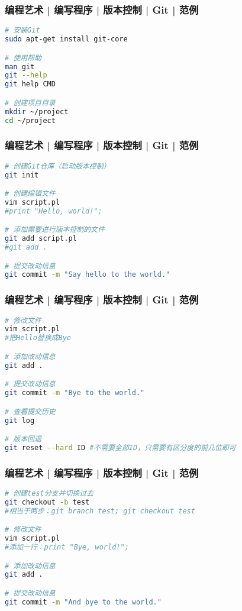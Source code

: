 \begin{frame}[fragile]
  \frametitle{编程艺术 | 编写程序 | 版本控制 | Git | 范例}
\begin{lstlisting}[language=sh]
# 安装Git
sudo apt-get install git-core

# 使用帮助
man git
git --help
git help CMD

# 创建项目目录
mkdir ~/project
cd ~/project
\end{lstlisting}
\end{frame}

\begin{frame}[fragile]
  \frametitle{编程艺术 | 编写程序 | 版本控制 | Git | \alert{范例}}
\begin{lstlisting}[language=sh]
# 创建Git仓库（启动版本控制）
git init

# 创建编辑文件
vim script.pl
#print "Hello, world!";

# 添加需要进行版本控制的文件
git add script.pl
#git add .

# 提交改动信息
git commit -m "Say hello to the world."
\end{lstlisting}
\end{frame}

\begin{frame}[fragile]
  \frametitle{编程艺术 | 编写程序 | 版本控制 | Git | 范例}
\begin{lstlisting}[language=sh]
# 修改文件
vim script.pl
#把Hello替换成Bye

# 添加改动信息
git add .

# 提交改动信息
git commit -m "Bye to the world."

# 查看提交历史
git log

# 版本回退
git reset --hard ID #不需要全部ID，只需要有区分度的前几位即可
\end{lstlisting}
\end{frame}

\begin{frame}[fragile]
  \frametitle{编程艺术 | 编写程序 | 版本控制 | Git | 范例}
\begin{lstlisting}[language=sh]
# 创建test分支并切换过去
git checkout -b test
#相当于两步：git branch test; git checkout test

# 修改文件
vim script.pl
#添加一行：print "Bye, world!";

# 添加改动信息
git add .

# 提交改动信息
git commit -m "And bye to the world."
\end{lstlisting}
\end{frame}

